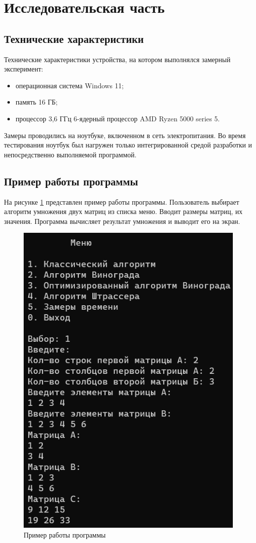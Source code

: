 \section{Исследовательская часть}

\subsection{Технические характеристики}

Технические характеристики устройства, на котором выполнялся замерный эксперимент:
\begin{itemize}[label*=---]
	\item операционная система Windows 11;
	\item память 16 ГБ;
	\item процессор 3,6 ГГц 6-ядерный процессор AMD Ryzen 5000 series 5.
\end{itemize}

Замеры проводились на ноутбуке, включенном в сеть электропитания. 
Во время тестирования ноутбук был нагружен только интегрированной средой разработки и непосредственно выполняемой программой.

\subsection{Пример работы программы}

На рисунке \ref{fig:example} представлен пример работы программы. 
Пользователь выбирает алгоритм умножения двух матриц из списка меню.
Вводит размеры матриц, их значения.
Программа вычисляет результат умножения и выводит его на экран.

\begin{figure}
	\centering
	\includegraphics[width=0.4\linewidth]{images/example}
	\caption{Пример работы программы}
	\label{fig:example}
\end{figure}

